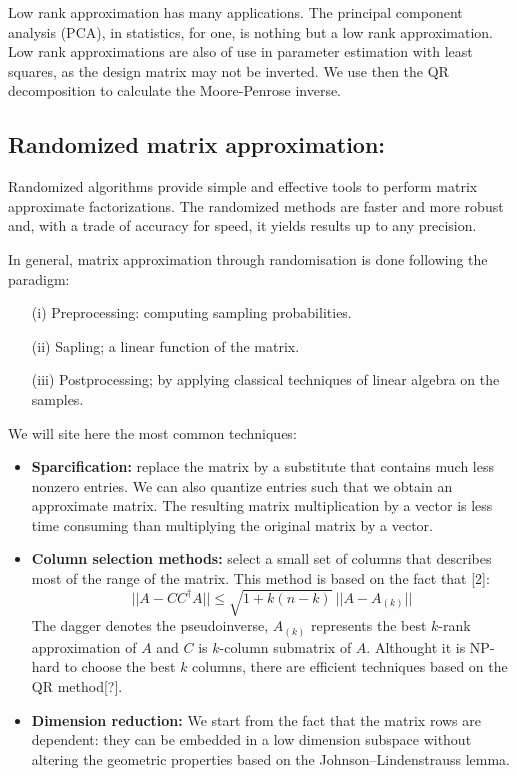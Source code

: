\documentclass[onecolumn,11pt]{article}
\begin{document}
Low rank approximation has many applications. The principal component analysis (PCA), in statistics, for one, is nothing but a low rank approximation. Low rank approximations are also of use in parameter estimation with least squares, as the design matrix may not be inverted. We use then the QR decomposition to calculate the Moore-Penrose inverse.

\subsection{Randomized matrix approximation:}

Randomized algorithms provide simple and effective tools to perform matrix approximate factorizations. The randomized methods are faster and more robust and, with a trade of accuracy for speed, it yields results up to any precision.

In general, matrix approximation through randomisation is done following the paradigm: 

\begin{itemize}
\item[(i)] Preprocessing: computing sampling probabilities.
\item[(ii)] Sapling; a linear function of the matrix.
\item[(iii)] Postprocessing; by applying classical techniques of linear algebra on the samples.
\end{itemize}

We will site here the most common techniques:

\begin{itemize}
\item \textbf{Sparcification:} replace the matrix by a substitute that contains much less nonzero entries. We can also quantize entries such that we obtain an approximate matrix. The resulting matrix multiplication by a vector is less time consuming than multiplying the original matrix by a vector.
\item \textbf{Column selection methods:} select a small set of columns that describes most of the range of the matrix. This method is based on the fact that [2]:
\begin{equation}
||A-CC^{\dagger}A|| \leq \sqrt{1+k(n-k)} \ ||A-A_{(k)}|| 
\end{equation}
The dagger denotes the pseudoinverse, $A_{(k)}$ represents the best $k$-rank approximation of $A$ and $C$ is $k$-column submatrix of $A$. Althought it is NP-hard to choose the best $k$ columns, there are efficient techniques based on the QR method[?].

\item \textbf{Dimension reduction:} We start from the fact that the matrix rows are dependent: they can be embedded in a low dimension subspace without altering the geometric properties based on the Johnson–Lindenstrauss lemma.

\end{itemize}
\end{document}
